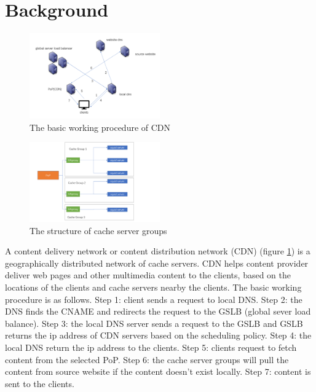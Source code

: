 \documentclass[5p]{elsarticle}
\begin{document}
\section{Background}
\begin{figure}[h]
    \centering
    \includegraphics[width=0.5\textwidth]{CDN_new.png}
    \caption{The basic working procedure of CDN}
    \label{fig:CDN}
\end{figure}

\begin{figure}[h]
    \centering
    \includegraphics[width=0.5\textwidth]{cache_group.png}
    \caption{The structure of cache server groups}
    \label{fig: the structure of PoP}
\end{figure}

A content delivery network or content distribution network (CDN) (figure \ref{fig:CDN}) is a geographically distributed network of cache servers. CDN helps content provider deliver web pages and other multimedia content to the clients, based on the locations of the clients and cache servers nearby the clients. The basic working procedure is as follows. Step 1: client sends a request to local DNS. Step 2: the DNS finds the CNAME and redirects the request to the GSLB (global sever load balance). Step 3: the local DNS server sends a request to the GSLB and GSLB returns the ip address of CDN servers based on the scheduling policy. Step 4: the local DNS return the ip address to the clients. Step 5: clients request to fetch content from the selected PoP. Step 6: the cache server groups will pull the content from source website if the content doesn't exist locally. Step 7: content is sent to the clients.
\end{document}
